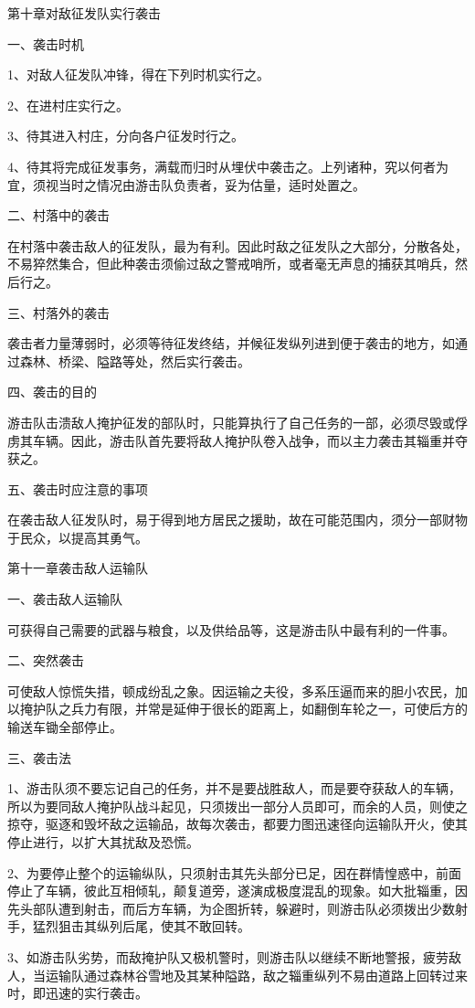 第十章对敌征发队实行袭击

一、袭击时机

1、对敌人征发队冲锋，得在下列时机实行之。

2、在进村庄实行之。

3、待其进入村庄，分向各户征发时行之。

4、待其将完成征发事务，满载而归时从埋伏中袭击之。上列诸种，究以何者为宜，须视当时之情况由游击队负责者，妥为估量，适时处置之。

二、村落中的袭击

在村落中袭击敌人的征发队，最为有利。因此时敌之征发队之大部分，分散各处，不易猝然集合，但此种袭击须偷过敌之警戒哨所，或者毫无声息的捕获其哨兵，然后行之。

三、村落外的袭击

袭击者力量薄弱时，必须等待征发终结，并候征发纵列进到便于袭击的地方，如通过森林、桥梁、隘路等处，然后实行袭击。

四、袭击的目的

游击队击溃敌人掩护征发的部队时，只能算执行了自己任务的一部，必须尽毁或俘虏其车辆。因此，游击队首先要将敌人掩护队卷入战争，而以主力袭击其辎重并夺获之。

五、袭击时应注意的事项

在袭击敌人征发队时，易于得到地方居民之援助，故在可能范围内，须分一部财物于民众，以提高其勇气。

第十一章袭击敌人运输队

一、袭击敌人运输队

可获得自己需要的武器与粮食，以及供给品等，这是游击队中最有利的一件事。

二、突然袭击

可使敌人惊慌失措，顿成纷乱之象。因运输之夫役，多系压逼而来的胆小农民，加以掩护队之兵力有限，并常是延伸于很长的距离上，如翻倒车轮之一，可使后方的输送车锄全部停止。

三、袭击法

1、游击队须不要忘记自己的任务，并不是要战胜敌人，而是要夺获敌人的车辆，所以为要同敌人掩护队战斗起见，只须拨出一部分人员即可，而余的人员，则使之掠夺，驱逐和毁坏敌之运输品，故每次袭击，都要力图迅速径向运输队开火，使其停止进行，以扩大其扰敌及恐慌。


2、为要停止整个的运输纵队，只须射击其先头部分已足，因在群情惶惑中，前面停止了车辆，彼此互相倾轧，颠复道旁，遂演成极度混乱的现象。如大批辎重，因先头部队遭到射击，而后方车辆，为企图折转，躲避时，则游击队必须拨出少数射手，猛烈狙击其纵列后尾，使其不敢回转。

3、如游击队劣势，而敌掩护队又极机警时，则游击队以继续不断地警报，疲劳敌人，当运输队通过森林谷雪地及其某种隘路，敌之辎重纵列不易由道路上回转过来吋，即迅速的实行袭击。

